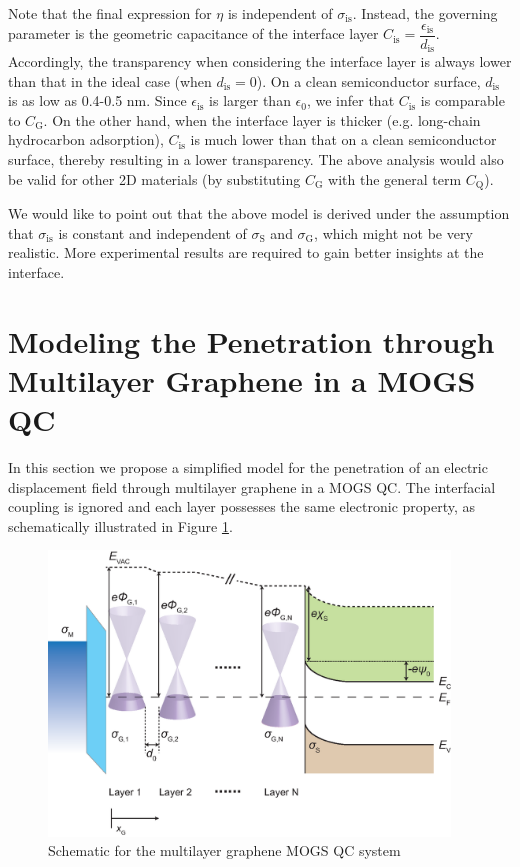 \documentclass[manuscript=suppinfo]{achemso}
\newcommand*\subs[1]{_{\text{#1}}} %
\begin{document}
Note that the final expression for $\eta$ is independent of $\sigma\subs{is}$. 
Instead, the governing parameter is the geometric capacitance of the interface layer $C\subs{is}=\dfrac{\epsilon\subs{is}}{d\subs{is}}$.
Accordingly, the transparency when considering the interface layer is always lower than that in the ideal case (when $d\subs{is}=0$).
On a clean semiconductor surface, $d\subs{is}$ is as low as 0.4-0.5 nm.
Since $\epsilon\subs{is}$ is larger than $\epsilon\subs{0}$, we infer that $C\subs{is}$ is comparable to $C\subs{G}$.
On the other hand, when the interface layer is thicker (e.g. long-chain hydrocarbon adsorption), $C\subs{is}$ is much lower than that on a clean semiconductor surface, thereby resulting in a lower transparency.
The above analysis would also be valid for other 2D materials (by substituting $C\subs{G}$ with the general term $C\subs{Q}$).

We would like to point out that the above model is derived under the assumption that $\sigma\subs{is}$ is constant and independent of $\sigma\subs{S}$ and $\sigma\subs{G}$, which might not be very realistic.
More experimental results are required to gain better insights at the interface.
\newpage

\section{Modeling the Penetration through Multilayer Graphene in a MOGS QC}
In this section we propose a simplified model for the penetration of an electric displacement field through multilayer graphene in a MOGS QC.
The interfacial coupling is ignored and each layer possesses the same electronic property, as schematically illustrated in Figure \ref{fig:scheme_ML_MOGS}.
\begin{figure}[htbp]
  \centering
  \includegraphics[width=0.95\textwidth]{img/SI_ML_graphene.eps}
  \caption{Schematic for the multilayer graphene MOGS QC system}
  \label{fig:scheme_ML_MOGS}
\end{figure}
\end{document}
